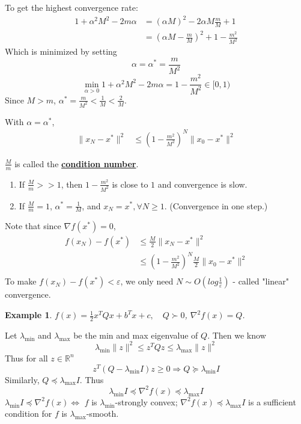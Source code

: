 \documentclass[11pt,a4paper]{article}
\newtheorem{example}{Example}
\begin{document}
To get the highest convergence rate:
\begin{equation}
    \begin{aligned}
        1+\alpha^2M^2-2m\alpha&=(\alpha M)^2-2\alpha M\frac{m}{M}+1\\
        &=(\alpha M-\frac{m}{M})^2+1-\frac{m^2}{M^2}
    \end{aligned}
    \nonumber
\end{equation}
Which is minimized by setting $$\alpha=\alpha^*=\frac{m}{M^2}$$
$$\min_{\alpha>0}1+\alpha^2M^2-2m\alpha=1-\frac{m^2}{M^2}\in[0,1)$$
Since $M>m$, $\alpha^*=\frac{m}{M^2}<\frac{1}{M}<\frac{2}{M}$.

With $\alpha=\alpha^*$,
\begin{equation}
    \begin{aligned}
        \|x_{N}-x^*\|^2&\leq (1-\frac{m^2}{M^2})^N\|x_0-x^*\|^2
    \end{aligned}
    \nonumber
\end{equation}

$\frac{M}{m}$ is called the \textbf{\underline{condition number}}.
\begin{enumerate}[$\bullet$]
    \item If $\frac{M}{m}>>1$, then $1-\frac{m^2}{M^2}$ is close to $1$ and convergence is slow.
    \item If $\frac{M}{m}=1$, $\alpha^*=\frac{1}{M}$, and $x_N=x^*,\forall N\geq 1$. (Convergence in one step.)
\end{enumerate}
Note that since $\nabla f(x^*)=0$,
\begin{equation}
    \begin{aligned}
        f(x_N)-f(x^*)&\leq \frac{M}{2}\|x_N-x^*\|^2\\
        &\leq (1-\frac{m^2}{M^2})^N\frac{M}{2}\|x_0-x^*\|^2\\
    \end{aligned}
    \nonumber
\end{equation}
To make $f(x_N)-f(x^*)<\varepsilon$, we only need $N\sim O(log\frac{1}{\varepsilon})$ - called "linear" convergence.

\begin{example}
    $f(x)=\frac{1}{2}x^TQx+b^Tx+c,\quad Q\succ 0$, $\nabla^2 f(x)=Q$.
\end{example}
Let $\lambda_{\min}$ and $\lambda_{\max}$ be the min and max eigenvalue of $Q$. Then we know $$\lambda_{\min}\|z\|^2\leq z^TQz\leq \lambda_{\max}\|z\|^2$$
Thus for all $z\in \mathbb{R}^n$
$$z^T(Q-\lambda_{\min}I)z\geq 0 \Rightarrow	Q\succeq \lambda_{\min}I$$
Similarly, $Q\preceq \lambda_{\max}I$. Thus
$$\lambda_{\min}I\preceq \nabla^2 f(x)\preceq \lambda_{\max}I$$
$\lambda_{\min}I\preceq \nabla^2 f(x) \Leftrightarrow$ $f$ is $\lambda_{\min}$-strongly convex; $\nabla^2 f(x)\preceq \lambda_{\max}I$ is a sufficient condition for $f$ is $\lambda_{\max}$-smooth.
\end{document}
